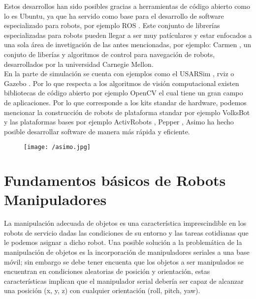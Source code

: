\documentclass[a4paper, openright, 12pt]{report}
\begin{document}
		Estos desarrollos han sido posibles gracias a herramientas de código abierto como lo es Ubuntu, ya que ha servido como base para el desarrollo de software especializado para robots, por ejemplo ROS \cite{rosEpage}. Este conjunto de librerías especializadas para robots pueden llegar a ser muy patículares y estar enfocados a una sola área de invetigación de las antes mencionadas, por ejemplo: Carmen \cite{carnegieMellon}, un conjuto de liberías y algoritmos de control para navegación de robots, desarrollados por la universidad Carnegie Mellon\cite{cMellonEpage}.\\

		En la parte de simulación se cuenta con ejemplos como el USARSim \cite{balakirsky2006}, rviz \cite{rVizEpage} o Gazebo \cite{gazeboEpage}. Por lo que respecta a los algoritmos de visión computacional existen bibliotecas de código abierto por ejemplo OpenCV \cite{openCV} el cual tiene un gran campo de aplicaciones\cite{bradski2000}. Por lo que corresponde a los kits standar de hardware, podemos mencionar la construcción de robots de plataforma standar por ejemplo VolksBot \cite{wisspeintner2007} y las plataformas bases por ejemplo ActivRobots \cite{ActivRobots}, Pepper \cite{pepperEpage}, Asimo \cite{asimoEpage} ha hecho posible desarrollar software de manera más rápida y eficiente.\\

		\begin{figure}[htb]
			\begin{center}
			\texttt{[image: /asimo.jpg]}
			\end{center}
		\end{figure}




	\section{Fundamentos básicos de Robots Manipuladores}
		La manipulación adecuada de objetos es una característica imprescindible en los robots de servicio dadas las condiciones de su entorno y las tareas cotidianas que le podemos asignar a dicho robot. Una posible solución a la problemática de la manipulación de objetos es la incorporación de manipuladores seriales a una base móvil; sin embargo se debe tener encuenta que los objetos a ser manipulados se encuentran en condiciones aleatorias de posición y orientación, estas características implican que el manipulador serial debería ser capaz de alcanzar una posición (x, y, z) con cualquier orientación (roll, pitch, yaw).\\
\end{document}
